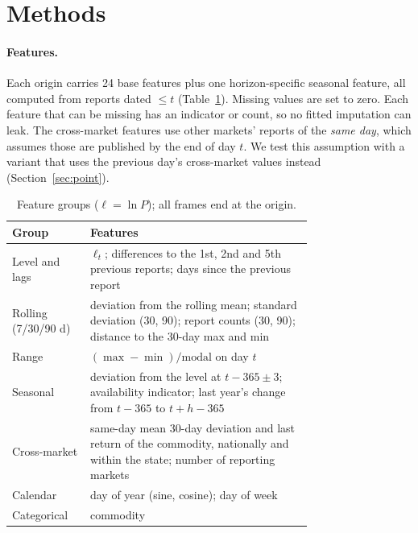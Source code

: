 \section{Methods}\label{sec:methods}

\paragraph{Features.}
Each origin carries 24 base features plus one horizon-specific seasonal feature, all computed from reports dated $\le t$ (Table~\ref{tab:features}).
Missing values are set to zero. Each feature that can be missing has an indicator or count, so no fitted imputation can leak.
The cross-market features use other markets' reports of the \emph{same day}, which assumes those are published by the end of day $t$.
We test this assumption with a variant that uses the previous day's cross-market values instead (Section~\ref{sec:point}).

\begin{table}[t]\centering\small
\caption{Feature groups ($\ell=\ln P$); all frames end at the origin.}\label{tab:features}
\begin{tabular}{@{}lp{0.74\linewidth}@{}}\toprule
Group & Features\\\midrule
Level and lags & $\ell_t$; differences to the 1st, 2nd and 5th previous reports; days since the previous report\\
Rolling (7/30/90 d) & deviation from the rolling mean; standard deviation (30, 90); report counts (30, 90); distance to the 30-day max and min\\
Range & $(\max-\min)/\text{modal}$ on day $t$\\
Seasonal & deviation from the level at $t-365\pm3$; availability indicator; last year's change from $t-365$ to $t+h-365$\\
Cross-market & same-day mean 30-day deviation and last return of the commodity, nationally and within the state; number of reporting markets\\
Calendar & day of year (sine, cosine); day of week\\
Categorical & commodity\\\bottomrule
\end{tabular}\end{table}

